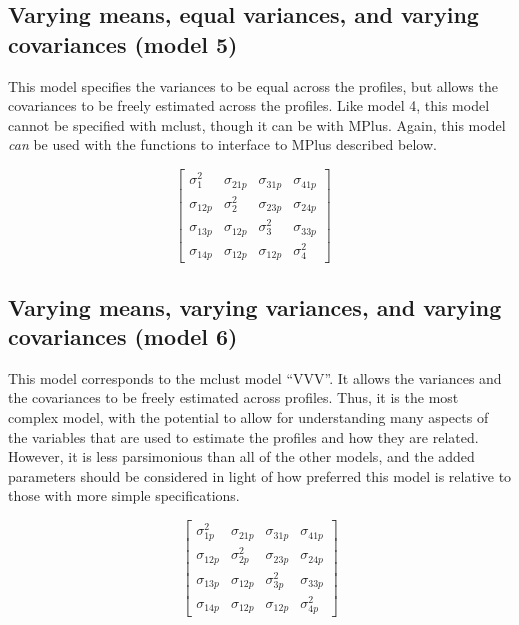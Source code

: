 \documentclass[]{msu-thesis}
\theoremstyle{definition}
\theoremstyle{definition}
\theoremstyle{definition}
\theoremstyle{remark}
\begin{document}
\subsection{Varying means, equal variances, and varying covariances
(model
5)}\label{varying-means-equal-variances-and-varying-covariances-model-5}

This model specifies the variances to be equal across the profiles, but
allows the covariances to be freely estimated across the profiles. Like
model 4, this model cannot be specified with mclust, though it can be
with MPlus. Again, this model \emph{can} be used with the functions to
interface to MPlus described below.

\[
\left[ \begin{matrix} { \sigma }_{ 1 }^{ 2 } & { \sigma }_{ 21p } & { \sigma }_{ 31p } & { \sigma }_{ 41p } \\ { \sigma }_{ 12p } & { \sigma }_{ 2 }^{ 2 } & { \sigma }_{ 23p } & { \sigma }_{ 24p } \\ { \sigma }_{ 13p } & { \sigma }_{ 12p } & { \sigma }_{ 3 }^{ 2 } & { \sigma }_{ 33p } \\ { \sigma }_{ 14p } & { \sigma }_{ 12p } & { \sigma }_{ 12p } & { \sigma }_{ 4 }^{ 2 } \end{matrix} \right] \quad
\]

\subsection{Varying means, varying variances, and varying covariances
(model
6)}\label{varying-means-varying-variances-and-varying-covariances-model-6}

This model corresponds to the mclust model ``VVV''. It allows the
variances and the covariances to be freely estimated across profiles.
Thus, it is the most complex model, with the potential to allow for
understanding many aspects of the variables that are used to estimate
the profiles and how they are related. However, it is less parsimonious
than all of the other models, and the added parameters should be
considered in light of how preferred this model is relative to those
with more simple specifications.

\[
\left[ \begin{matrix} { \sigma }_{ 1p }^{ 2 } & { \sigma }_{ 21p } & { \sigma }_{ 31p } & { \sigma }_{ 41p } \\ { \sigma }_{ 12p } & { \sigma }_{ 2p }^{ 2 } & { \sigma }_{ 23p } & { \sigma }_{ 24p } \\ { \sigma }_{ 13p } & { \sigma }_{ 12p } & { \sigma }_{ 3p }^{ 2 } & { \sigma }_{ 33p } \\ { \sigma }_{ 14p } & { \sigma }_{ 12p } & { \sigma }_{ 12p } & { \sigma }_{ 4p }^{ 2 } \end{matrix} \right]
\]
\end{document}
